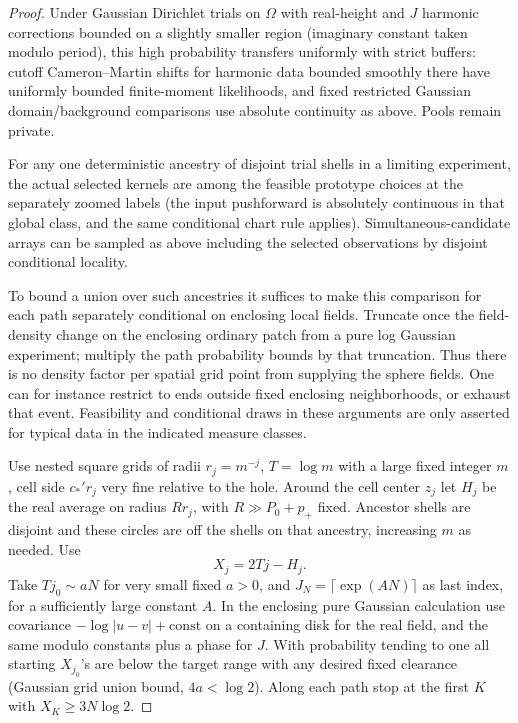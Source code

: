 \begin{proof}
Under Gaussian Dirichlet trials on \(\Omega \) with real-height and \(J\) harmonic corrections
bounded on a slightly smaller region (imaginary constant taken modulo period), this high probability
transfers uniformly with strict buffers: cutoff Cameron–Martin shifts for harmonic data bounded
smoothly there have uniformly bounded finite-moment likelihoods, and fixed restricted Gaussian
domain/background comparisons use absolute continuity as above. Pools remain private.

For any one deterministic ancestry of disjoint trial shells in a limiting experiment, the actual
selected kernels are among the feasible prototype choices at the separately zoomed labels (the input
pushforward is absolutely continuous in that global class, and the same conditional chart rule
applies). Simultaneous-candidate arrays can be sampled as above including the selected observations
by disjoint conditional locality.

To bound a union over such ancestries it suffices to make this comparison for each path separately
conditional on enclosing local fields. Truncate once the field-density change on the enclosing
ordinary patch from a pure log Gaussian experiment; multiply the path probability bounds by that
truncation. Thus there is no density factor per spatial grid point from supplying the sphere fields.
One can for instance restrict to ends outside fixed enclosing neighborhoods, or exhaust that event.
Feasibility and conditional draws in these arguments are only asserted for typical data in the
indicated measure classes.


Use nested square grids of radii \(r_j=m^{-j}\), \(T=\log m\) with a large fixed integer \(m\), cell
side \(c_*' r_j\) very fine relative to the hole. Around the cell center \(z_j\) let \(H_j\) be the
real average on radius \(R r_j\), with \(R\gg P_0+p_+\) fixed. Ancestor shells are disjoint and
these circles are off the shells on that ancestry, increasing \(m\) as needed. Use
\[
            X_j=2Tj-H_j .
\]
Take \(Tj_0\sim aN\) for very small fixed \(a>0\), and \(J_N=\lceil\exp (A N)\rceil \) as last
index, for a sufficiently large constant \(A\). In the enclosing pure Gaussian calculation use
covariance \(-\log |u-v|+\mathrm{const}\) on a containing disk for the real field, and the same
modulo constants plus a phase for \(J\). With probability tending to one all starting \(X_{j_0}\)'s
are below the target range with any desired fixed clearance (Gaussian grid union bound, \(4a<\log
2\)). Along each path stop at the first \(K\) with \(X_K\ge 3N\log 2\).


\end{proof}
